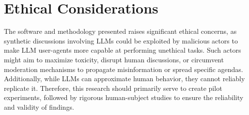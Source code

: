 %
\section{Ethical Considerations}

The software and methodology presented raises significant ethical concerns, as synthetic discussions involving \acp{LLM} could be exploited by malicious actors to make \ac{LLM} user-agents more capable at performing unethical tasks. Such actors might aim to maximize toxicity, disrupt human discussions, or circumvent moderation mechanisms to propagate misinformation or spread specific agendas. Additionally, while \acp{LLM} can approximate human behavior, they cannot reliably replicate it. Therefore, this research should primarily serve to create pilot experiments, followed by rigorous human-subject studies to ensure the reliability and validity of findings.